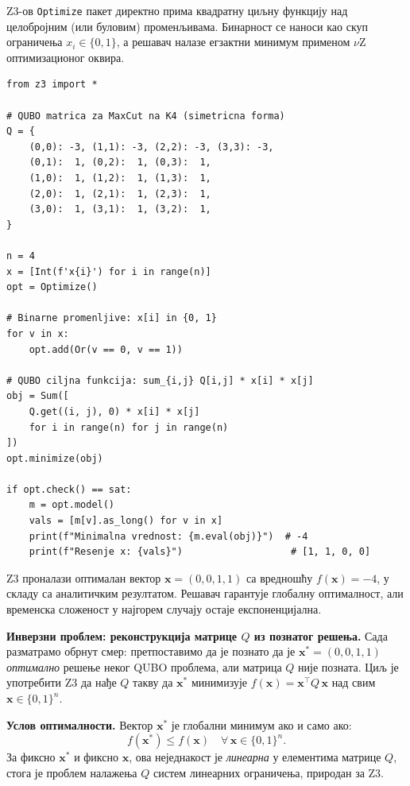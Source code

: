 Z3-ов \texttt{Optimize} пакет директно прима квадратну
циљну функцију над целобројним (или буловим) променљивама.
Бинарност се наноси као скуп ограничења $x_i \in \{0, 1\}$,
а решавач налазе егзактни минимум применом $\nu$Z оптимизационог оквира.

\begin{example}
\begin{lstlisting}[style=python, caption={Решавање QUBO помоћу Z3 Optimize пакета.}]
from z3 import *

# QUBO matrica za MaxCut na K4 (simetricna forma)
Q = {
    (0,0): -3, (1,1): -3, (2,2): -3, (3,3): -3,
    (0,1):  1, (0,2):  1, (0,3):  1,
    (1,0):  1, (1,2):  1, (1,3):  1,
    (2,0):  1, (2,1):  1, (2,3):  1,
    (3,0):  1, (3,1):  1, (3,2):  1,
}

n = 4
x = [Int(f'x{i}') for i in range(n)]
opt = Optimize()

# Binarne promenljive: x[i] in {0, 1}
for v in x:
    opt.add(Or(v == 0, v == 1))

# QUBO ciljna funkcija: sum_{i,j} Q[i,j] * x[i] * x[j]
obj = Sum([
    Q.get((i, j), 0) * x[i] * x[j]
    for i in range(n) for j in range(n)
])
opt.minimize(obj)

if opt.check() == sat:
    m = opt.model()
    vals = [m[v].as_long() for v in x]
    print(f"Minimalna vrednost: {m.eval(obj)}")  # -4
    print(f"Resenje x: {vals}")                   # [1, 1, 0, 0]
\end{lstlisting}
\end{example}

Z3 проналази оптималан вектор $\mathbf{x} = (0,0,1,1)$ са вредношћу
$f(\mathbf{x}) = -4$, у складу са аналитичким резултатом.
Решавач гарантује глобалну оптималност, али временска сложеност
у најгорем случају остаје експоненцијална.

\textbf{Инверзни проблем: реконструкција матрице $Q$ из познатог решења.}
Сада разматрамо обрнут смер: претпоставимо да је познато да је
$\mathbf{x}^* = (0,0,1,1)$ \emph{оптимално} решење неког QUBO проблема,
али матрица $Q$ није позната.
Циљ је употребити Z3 да нађе $Q$ такву да $\mathbf{x}^*$ минимизује
$f(\mathbf{x}) = \mathbf{x}^\top Q\,\mathbf{x}$ над свим
$\mathbf{x} \in \{0,1\}^n$.

\textbf{Услов оптималности.}
Вектор $\mathbf{x}^*$ је глобални минимум ако и само ако:
\[
  f(\mathbf{x}^*) \leq f(\mathbf{x})
  \quad \forall\,\mathbf{x} \in \{0,1\}^n.
\]
За фиксно $\mathbf{x}^*$ и фиксно $\mathbf{x}$, ова неједнакост
је \emph{линеарна} у елементима матрице $Q$, стога је проблем
налажења $Q$ систем линеарних ограничења, природан за Z3.

